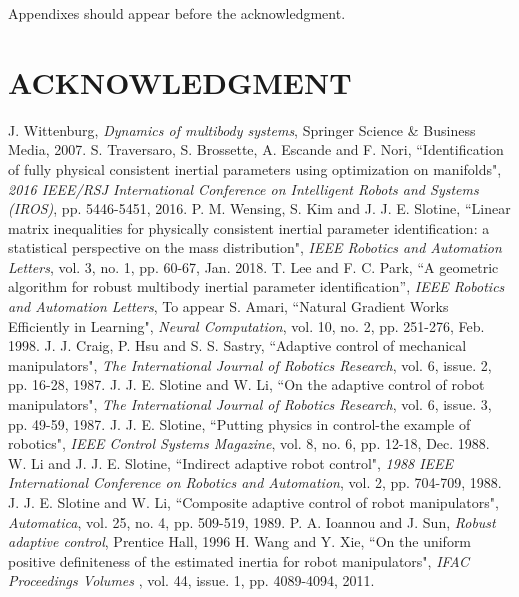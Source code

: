 \documentclass[letterpaper, 10 pt, conference]{ieeeconf}  %
\begin{document}
Appendixes should appear before the acknowledgment.

\section*{ACKNOWLEDGMENT}



\begin{thebibliography}{99}
  J. Wittenburg, {\em Dynamics of multibody systems}, Springer Science \& Business Media, 2007.
 S. Traversaro, S. Brossette, A. Escande and F. Nori, ``Identification of fully physical consistent inertial parameters using optimization on manifolds", {\em 2016 IEEE/RSJ International Conference on Intelligent Robots and Systems (IROS)}, pp. 5446-5451, 2016.
 P. M. Wensing, S. Kim and J. J. E. Slotine, ``Linear matrix inequalities for physically consistent inertial parameter identification: a statistical perspective on the mass distribution", {\em IEEE Robotics and Automation Letters}, vol. 3, no. 1, pp. 60-67, Jan. 2018.
 T. Lee and F. C. Park, ``A geometric algorithm for robust multibody inertial parameter identification'', {\em IEEE Robotics and Automation Letters}, To appear
 S. Amari, ``Natural Gradient Works Efficiently in Learning", {\em Neural Computation}, vol. 10, no. 2, pp. 251-276, Feb. 1998.
 J. J. Craig, P. Hsu and S. S. Sastry, ``Adaptive control of mechanical manipulators", {\em The International Journal of Robotics Research}, vol. 6, issue. 2, pp. 16-28, 1987.
 J. J. E. Slotine and W. Li, ``On the adaptive control of robot manipulators", {\em The International Journal of Robotics Research}, vol. 6, issue. 3, pp. 49-59, 1987. 
 J. J. E. Slotine, ``Putting physics in control-the example of robotics", {\em IEEE Control Systems Magazine}, vol. 8, no. 6, pp. 12-18, Dec. 1988.
 W. Li and J. J. E. Slotine, ``Indirect adaptive robot control", {\em  1988 IEEE International Conference on Robotics and Automation}, vol. 2, pp. 704-709, 1988.
 J. J. E. Slotine and W. Li, ``Composite adaptive control of robot manipulators", {\em Automatica}, vol. 25, no. 4, pp. 509-519, 1989.
 P. A. Ioannou and J. Sun, {\em Robust adaptive control}, Prentice Hall, 1996
 H. Wang and Y. Xie, ``On the uniform positive definiteness of the estimated inertia for robot manipulators", {\em IFAC Proceedings Volumes }, vol. 44, issue. 1, pp. 4089-4094, 2011.


\end{thebibliography}
\end{document}
